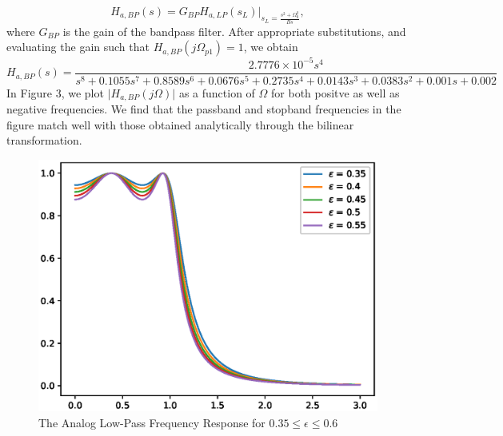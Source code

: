 \documentclass{article}
\begin{document}
\begin{enumerate}
\begin{equation}
H_{a,BP}(s) = G_{BP}H_{a,LP}(s_L)\vert_{s_L = \frac{s^2 + \Omega_0^2}{Bs}},
\end{equation}
where $G_{BP}$ is the gain of the bandpass filter.  After appropriate substitutions, and evaluating the gain 
such that $H_{a,BP}(j\Omega_{p1}) = 1$, we obtain
{\tiny
\begin{equation}
\label{bpfinal}
H_{a,BP}(s) = \frac{2.7776\times 10^{-5}s^4}{s^8+0.1055s^7+0.8589s^6+0.0676s^5+0.2735s^4+0.0143s^3+0.0383s^2+0.001s+0.002}
\end{equation}
}
In Figure 3, we plot $\vert H_{a,BP}(j\Omega)\vert$ as a function of $\Omega$ for both positve as
well as negative frequencies.  We find that the passband and stopband frequencies in the figure
match well with those obtained analytically through the bilinear transformation.
\end{enumerate}
\begin{figure}
\label{fig1}
\includegraphics[width = 15cm]{figs/iir/varyingepsilon.eps}
\caption{The Analog Low-Pass Frequency Response for $0.35 \leq \epsilon \leq 0.6$}
\end{figure}
\end{document}
